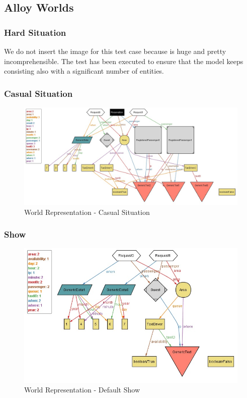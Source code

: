 	\subsection{Alloy Worlds}
		\subsubsection{Hard Situation}
		We do not insert the image for this test case because is huge and
		pretty incomprehensible. The test has been executed to ensure that the
		model keeps consisting also with a significant number of entities.
		\newpage
		\begin{landscape}
		\subsubsection{Casual Situation}
			\begin{figure}[!h]
				\begin{center}			
					\includegraphics[height=0.75\textheight]{../SE2_ALLOY/CasualSituation}
					\caption{World Representation - Casual Situation}	
				\end{center}
			\end{figure}
		\end{landscape}
		\newpage
		\begin{landscape}
		\subsubsection{Show}
			\begin{figure}[!h]
				\begin{center}			
					\includegraphics[height=0.75\textheight]{../SE2_ALLOY/Show}
					\caption{World Representation - Default Show}	
				\end{center}
			\end{figure}
		\end{landscape}